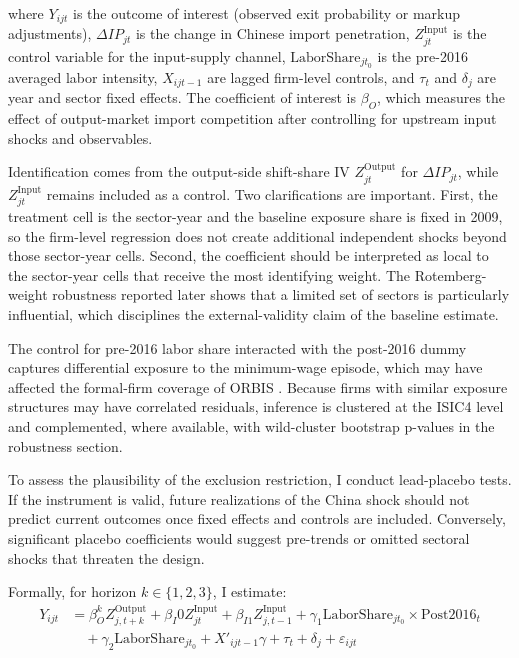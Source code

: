 \documentclass[12pt]{article}
\begin{document}
where $Y_{ijt}$ is the outcome of interest (observed exit probability or markup adjustments), $\Delta IP_{jt}$ is the change in Chinese import penetration, $Z_{jt}^{\text{Input}}$ is the control variable for the input-supply channel, $\text{LaborShare}_{jt_0}$ is the pre-2016 averaged labor intensity, $X_{ijt-1}$ are lagged firm-level controls, and $\tau_t$ and $\delta_j$ are year and sector fixed effects. The coefficient of interest is $\beta_O$, which measures the effect of output-market import competition after controlling for upstream input shocks and observables.

Identification comes from the output-side shift-share IV $Z_{jt}^{\text{Output}}$ for $\Delta IP_{jt}$, while $Z_{jt}^{\text{Input}}$ remains included as a control. Two clarifications are important. First, the treatment cell is the sector-year and the baseline exposure share is fixed in 2009, so the firm-level regression does not create additional independent shocks beyond those sector-year cells. Second, the coefficient should be interpreted as local to the sector-year cells that receive the most identifying weight. The Rotemberg-weight robustness reported later shows that a limited set of sectors is particularly influential, which disciplines the external-validity claim of the baseline estimate.

The control for pre-2016 labor share interacted with the post-2016 dummy captures differential exposure to the minimum-wage episode, which may have affected the formal-firm coverage of ORBIS \parencite{akcigitFactsBusinessDynamism2020}. Because firms with similar exposure structures may have correlated residuals, inference is clustered at the ISIC4 level and complemented, where available, with wild-cluster bootstrap p-values in the robustness section.

To assess the plausibility of the exclusion restriction, I conduct lead-placebo tests. If the instrument is valid, future realizations of the China shock should not predict current outcomes once fixed effects and controls are included. Conversely, significant placebo coefficients would suggest pre-trends or omitted sectoral shocks that threaten the design.

Formally, for horizon $k \in \{1,2,3\}$, I estimate:
\begin{equation}
\begin{aligned}
Y_{ijt} &= \beta^{k}_O Z^{\text{Output}}_{j,t+k} + \beta_I0 Z_{jt}^{\text{Input}} + \beta_{I1} Z_{j,t-1}^{\text{Input}} + \gamma_1 \text{LaborShare}_{jt_0} \times \text{Post2016}_t \\
&\quad + \gamma_2 \text{LaborShare}_{jt_0} + X'_{ijt-1} \gamma + \tau_t + \delta_j + \varepsilon_{ijt}
\end{aligned}
\end{equation}
\end{document}
